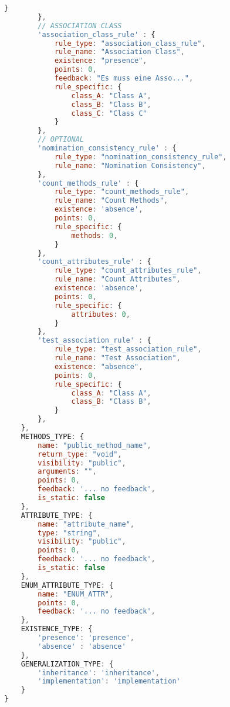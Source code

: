 \begin{lstlisting}[caption={Rules Definition JSON}, label={lst:rules_def}, language=javascript]
            }
        },
        // ASSOCIATION CLASS
        'association_class_rule' : {
            rule_type: "association_class_rule",
            rule_name: "Association Class",
            existence: "presence",
            points: 0,
            feedback: "Es muss eine Asso...",
            rule_specific: {
                class_A: "Class A",
                class_B: "Class B",
                class_C: "Class C"
            }
        },
        // OPTIONAL
        'nomination_consistency_rule' : {
            rule_type: "nomination_consistency_rule",
            rule_name: "Nomination Consistency",
        },
        'count_methods_rule' : {
            rule_type: "count_methods_rule",
            rule_name: "Count Methods",
            existence: 'absence',
            points: 0,
            rule_specific: {
                methods: 0,
            }
        },
        'count_attributes_rule' : {
            rule_type: "count_attributes_rule",
            rule_name: "Count Attributes",
            existence: 'absence',
            points: 0,
            rule_specific: {
                attributes: 0,
            }
        },
        'test_association_rule' : {
            rule_type: "test_association_rule",
            rule_name: "Test Association",
            existence: "absence",
            points: 0,
            rule_specific: {
                class_A: "Class A",
                class_B: "Class B",
            }
        },
    },
    METHODS_TYPE: {
        name: "public_method_name",
        return_type: "void",
        visibility: "public",
        arguments: "",
        points: 0,
        feedback: '... no feedback',
        is_static: false
    },
    ATTRIBUTE_TYPE: {
        name: "attribute_name",
        type: "string",
        visibility: "public",
        points: 0,
        feedback: '... no feedback',
        is_static: false
    },
    ENUM_ATTRIBUTE_TYPE: {
        name: "ENUM_ATTR",
        points: 0,
        feedback: '... no feedback',
    },
    EXISTENCE_TYPE: {
        'presence': 'presence',
        'absence' : 'absence'
    },
    GENERALIZATION_TYPE: {
        'inheritance': 'inheritance',
        'implementation': 'implementation'
    }
}
\end{lstlisting}